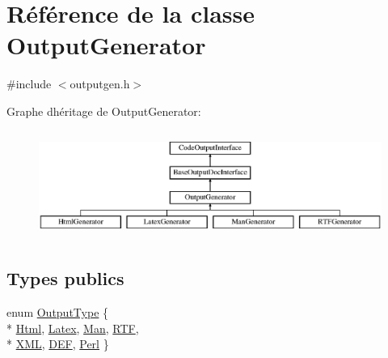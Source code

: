 \hypertarget{class_output_generator}{}\section{Référence de la classe Output\+Generator}
\label{class_output_generator}


{\ttfamily \#include $<$outputgen.\+h$>$}

Graphe d\textquotesingle{}héritage de Output\+Generator\+:\begin{figure}[H]
\begin{center}
\leavevmode
\includegraphics[height=3.544304cm]{class_output_generator}
\end{center}
\end{figure}
\subsection*{Types publics}
\begin{DoxyCompactItemize}
\item 
enum \hyperlink{class_output_generator_ab79b5d3c19d95c8a5929c07f5b2918cf}{Output\+Type} \{ \\*
\hyperlink{class_output_generator_ab79b5d3c19d95c8a5929c07f5b2918cfa60460668b0f6b570f3ec84e48b53f4cf}{Html}, 
\hyperlink{class_output_generator_ab79b5d3c19d95c8a5929c07f5b2918cfaa80d6ff5f1d2bb8514fe7da749ce8dda}{Latex}, 
\hyperlink{class_output_generator_ab79b5d3c19d95c8a5929c07f5b2918cfa1c0c53e266b0c5a29ba3ab795811340d}{Man}, 
\hyperlink{class_output_generator_ab79b5d3c19d95c8a5929c07f5b2918cfa0beb497266ccc7f49ea597556e58914e}{R\+T\+F}, 
\\*
\hyperlink{class_output_generator_ab79b5d3c19d95c8a5929c07f5b2918cfac2e6889ca4538412c55c0f22866e3c0b}{X\+M\+L}, 
\hyperlink{class_output_generator_ab79b5d3c19d95c8a5929c07f5b2918cfa58caa6924f3437894cd040f5f6b3ceba}{D\+E\+F}, 
\hyperlink{class_output_generator_ab79b5d3c19d95c8a5929c07f5b2918cfa225b135493e52f986c11789674a76204}{Perl}
 \}
\end{DoxyCompactItemize}
